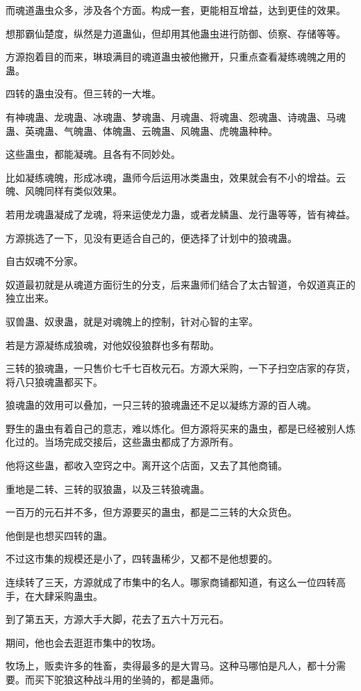 \begin{this_body}
而魂道蛊虫众多，涉及各个方面。构成一套，更能相互增益，达到更佳的效果。

想那霸仙楚度，纵然是力道蛊仙，但却用其他蛊虫进行防御、侦察、存储等等。

方源抱着目的而来，琳琅满目的魂道蛊虫被他撇开，只重点查看凝练魂魄之用的蛊。

四转的蛊虫没有。但三转的一大堆。

有神魂蛊、龙魂蛊、冰魂蛊、梦魂蛊、月魂蛊、将魂蛊、怨魂蛊、诗魂蛊、马魂蛊、英魂蛊、气魄蛊、体魄蛊、云魄蛊、风魄蛊、虎魄蛊种种。

这些蛊虫，都能凝魂。且各有不同妙处。

比如凝练魂魄，形成冰魂，蛊师今后运用冰类蛊虫，效果就会有不小的增益。云魄、风魄同样有类似效果。

若用龙魂蛊凝成了龙魂，将来运使龙力蛊，或者龙鳞蛊、龙行蛊等等，皆有裨益。

方源挑选了一下，见没有更适合自己的，便选择了计划中的狼魂蛊。

自古奴魂不分家。

奴道最初就是从魂道方面衍生的分支，后来蛊师们结合了太古智道，令奴道真正的独立出来。

驭兽蛊、奴隶蛊，就是对魂魄上的控制，针对心智的主宰。

若是方源凝练成狼魂，对他奴役狼群也多有帮助。

三转的狼魂蛊，一只售价七千七百枚元石。方源大采购，一下子扫空店家的存货，将八只狼魂蛊都买下。

狼魂蛊的效用可以叠加，一只三转的狼魂蛊还不足以凝练方源的百人魂。

野生的蛊虫有着自己的意志，难以炼化。但方源将买来的蛊虫，都是已经被别人炼化过的。当场完成交接后，这些蛊虫都成了方源所有。

他将这些蛊，都收入空窍之中。离开这个店面，又去了其他商铺。

重地是二转、三转的驭狼蛊，以及三转狼魂蛊。

一百万的元石并不多，但方源要买的蛊虫，都是二三转的大众货色。

他倒是也想买四转的蛊。

不过这市集的规模还是小了，四转蛊稀少，又都不是他想要的。

连续转了三天，方源就成了市集中的名人。哪家商铺都知道，有这么一位四转高手，在大肆采购蛊虫。

到了第五天，方源大手大脚，花去了五六十万元石。

期间，他也会去逛逛市集中的牧场。

牧场上，贩卖许多的牲畜，卖得最多的是大胃马。这种马哪怕是凡人，都十分需要。而买下驼狼这种战斗用的坐骑的，都是蛊师。


\end{this_body}
